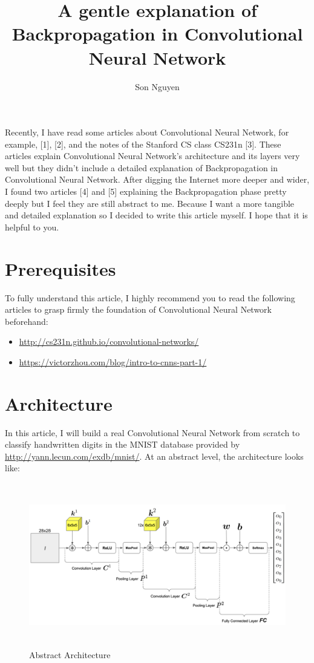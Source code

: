 \documentclass[a4paper,12pt]{article}
\title{A gentle explanation of Backpropagation in Convolutional Neural Network}
\author{Son Nguyen}
\begin{document}
\maketitle
Recently, I have read some articles about Convolutional Neural Network, for example, [1], [2], and the notes of the Stanford CS class CS231n [3]. These articles explain Convolutional Neural Network's architecture and its layers very well but they didn't include a detailed explanation of Backpropagation in Convolutional Neural Network. After digging the Internet more deeper and wider, I found two articles [4] and [5] explaining the Backpropagation phase pretty deeply but I feel they are still abstract to me. Because I want a more tangible and detailed explanation so I decided to write this article myself. I hope that it is helpful to you.

\newpage
\section{Prerequisites}
To fully understand this article, I highly recommend you to read the following articles to grasp firmly the foundation of Convolutional Neural Network beforehand:
\begin{itemize}
\item \url{http://cs231n.github.io/convolutional-networks/}
\item \url{https://victorzhou.com/blog/intro-to-cnns-part-1/}
\end{itemize}

\section{Architecture}
In this article, I will build a real Convolutional Neural Network from scratch to classify handwritten digits in the MNIST database provided by \url{http://yann.lecun.com/exdb/mnist/}. At an abstract level, the architecture looks like:
\begin{figure}[h]
  \begin{center}
    \includegraphics[width=15.6cm, height=7.15cm]{Architecture-abstract.png}
    \caption{Abstract Architecture}
  \end{center}
\end{figure}\\
\end{document}
